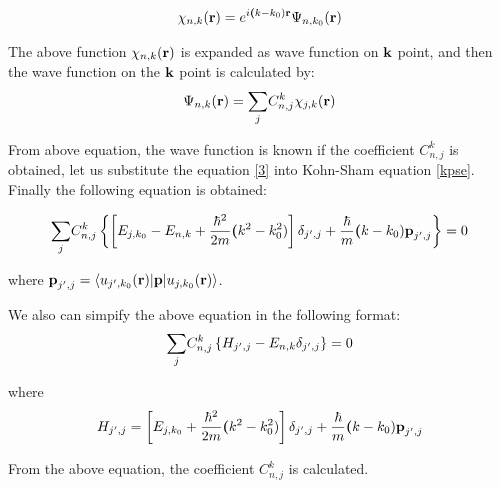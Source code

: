 \documentclass[a4paper, 12pt, titlepage,oneside,drop]{kthesis}
\begin{document}
\begin{equation}\label{2}
\chikp<n><k> = \expg<(k-k_0)>  \wfbloch<n><k_0> 
\end{equation}

The above function $\chikp<n><k> $ is expanded as wave function on ${ \textbf k}$ point, and then the wave function on the ${\textbf k}$ point is calculated by:
\begin{equation}\label{3}
\wfbloch<n><k> =  {\sum\limits_{j}} C_{n,j}^{k} \chikp<j><k> 
\end{equation}

From above equation, the wave function is known if the coefficient $C_{n,j}^{k}$ is obtained, let us substitute the equation \ref{3} into Kohn-Sham equation \ref{kpse}.
Finally the following equation is obtained:

\begin{equation}\label{5}
{\sum\limits_{j}}  C_{n,j}^{k} \left \{  \left [  \ebloch<j><k_0> -  \ebloch<n><k>  + \frac{{\hbar}^2}{2m} {\textbf (k^2-k_0^2)}    \right ] \delta_{j',j} + \frac{\hbar}{m} {\textbf(k-k_0)} {\textbf p_{j',j}} \right \} = 0
\end{equation}

where ${\textbf p_{j',j}} = \langle \ubloch<j'><k_0>| {\textbf p} | \ubloch<j><k_0>  \rangle $.
 
We also can simpify the above equation in the following format:
\begin{equation}\label{6}
{\sum\limits_{j}} C_{n,j}^{k} \left \{ H_{j',j}- \ebloch<n><k> \delta_{j',j} \right \} =0
\end{equation}

where
\begin{equation} \label{7}
H_{j',j} = \left [  \ebloch<j><k_0>  + \frac{{\hbar}^2}{2m} {\textbf (k^2-k_0^2)}    \right ] \delta_{j',j} + \frac{\hbar}{m} {\textbf(k-k_0)} {\textbf p_{j',j}}
\end{equation}

From the above equation, the coefficient $ C_{n,j}^{k}$ is calculated.

\end{document}
